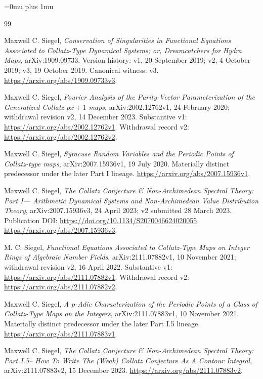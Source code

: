 \begingroup
\small
\sloppy
\def\UrlBreaks{\do\/\do-\do\_}
\Urlmuskip=0mu plus 1mu\relax
\begin{thebibliography}{99}

Maxwell C. Siegel,
\emph{Conservation of Singularities in Functional Equations Associated to
Collatz-Type Dynamical Systems; or, Dreamcatchers for Hydra Maps},
arXiv:1909.09733.  Version history: v1, 20 September 2019; v2,
4 October 2019; v3, 19 October 2019.  Canonical witness: v3.
\url{https://arxiv.org/abs/1909.09733v3}.

Maxwell C. Siegel,
\emph{Fourier Analysis of the Parity-Vector Parameterization of the
Generalized Collatz $px+1$ maps}, arXiv:2002.12762v1, 24 February 2020;
withdrawal revision v2, 14 December 2023.
Substantive v1: \url{https://arxiv.org/abs/2002.12762v1}.
Withdrawal record v2: \url{https://arxiv.org/abs/2002.12762v2}.

Maxwell C. Siegel,
\emph{Syracuse Random Variables and the Periodic Points of Collatz-type
maps}, arXiv:2007.15936v1, 19 July 2020.  Materially distinct predecessor
under the later Part I lineage.
\url{https://arxiv.org/abs/2007.15936v1}.

Maxwell C. Siegel,
\emph{The Collatz Conjecture \& Non-Archimedean Spectral Theory: Part I---
Arithmetic Dynamical Systems and Non-Archimedean Value Distribution Theory},
arXiv:2007.15936v3, 24 April 2023; v2 submitted 28 March 2023.
Publication DOI: \url{https://doi.org/10.1134/S2070046624020055}.
\url{https://arxiv.org/abs/2007.15936v3}.

M. C. Siegel,
\emph{Functional Equations Associated to Collatz-Type Maps on Integer Rings
of Algebraic Number Fields}, arXiv:2111.07882v1, 10 November 2021;
withdrawal revision v2, 16 April 2022.
Substantive v1: \url{https://arxiv.org/abs/2111.07882v1}.
Withdrawal record v2: \url{https://arxiv.org/abs/2111.07882v2}.

Maxwell C. Siegel,
\emph{A $p$-Adic Characterization of the Periodic Points of a Class of
Collatz-Type Maps on the Integers}, arXiv:2111.07883v1,
10 November 2021.  Materially distinct predecessor under the later Part I.5
lineage.  \url{https://arxiv.org/abs/2111.07883v1}.

Maxwell C. Siegel,
\emph{The Collatz Conjecture \& Non-Archimedean Spectral Theory: Part I.5--
How To Write The (Weak) Collatz Conjecture As A Contour Integral},
arXiv:2111.07883v2, 15 December 2023.
\url{https://arxiv.org/abs/2111.07883v2}.


\end{thebibliography}
